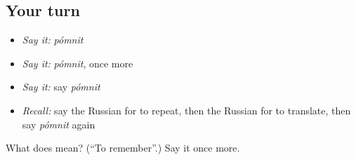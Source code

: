 \subsection*{Your turn}
\begin{itemize}
\raggedright
  \item \emph{Say it:} \emph{pómnit}
  \item \emph{Say it:} \emph{pómnit}, once more
  \item \emph{Say it:} say \emph{pómnit}
  \item \emph{Recall:} say the Russian for to repeat, then the Russian for to translate, then say \emph{pómnit} again
\end{itemize}

\begin{tcolorbox}[breakable,colback=teal!4,colframe=teal!35!black,title={Before you move on}]
What does  mean? (\textquotedblleft{}To remember\textquotedblright{}.) Say it once more.
\end{tcolorbox}
